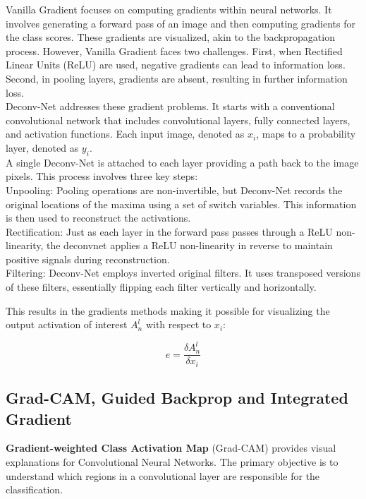 Vanilla Gradient \cite{simonyan2014deep} focuses on computing gradients within neural networks. It involves generating a forward pass of an image and then computing gradients for the class scores. These gradients are visualized, akin to the backpropagation process. However, Vanilla Gradient faces two challenges. First, when Rectified Linear Units (ReLU) are used, negative gradients can lead to information loss. Second, in pooling layers, gradients are absent, resulting in further information loss.
\\
Deconv-Net \cite{zeiler2013visualizing} addresses these gradient problems. It starts with a conventional convolutional network that includes convolutional layers, fully connected layers, and activation functions. Each input image, denoted as $x_i$, maps to a probability layer, denoted as $y_i$.
\\
A single Deconv-Net \cite{Zeiler2011AdaptiveDN} is attached to each layer providing a path back to the image pixels. This process involves three key steps:
\\
Unpooling: Pooling operations are non-invertible, but Deconv-Net records the original locations of the maxima using a set of switch variables. This information is then used to reconstruct the activations.\\

Rectification: Just as each layer in the forward pass passes through a ReLU non-linearity, the deconvnet applies a ReLU non-linearity in reverse to maintain positive signals during reconstruction.\\

Filtering: Deconv-Net employs inverted original filters. It uses transposed versions of these filters, essentially flipping each filter vertically and horizontally.

This results in the gradients methods \cite{baehrens2010} making it possible for visualizing the output activation of interest $A^l_n$ with respect to $x_i$:

$$ e = \frac{\delta A^l_n}{\delta x_i}$$


\subsection{Grad-CAM, Guided Backprop and Integrated Gradient}

\textbf{Gradient-weighted Class Activation Map} (Grad-CAM) provides visual explanations for Convolutional Neural Networks. The primary objective is to understand which regions in a convolutional layer are responsible for the classification. 

